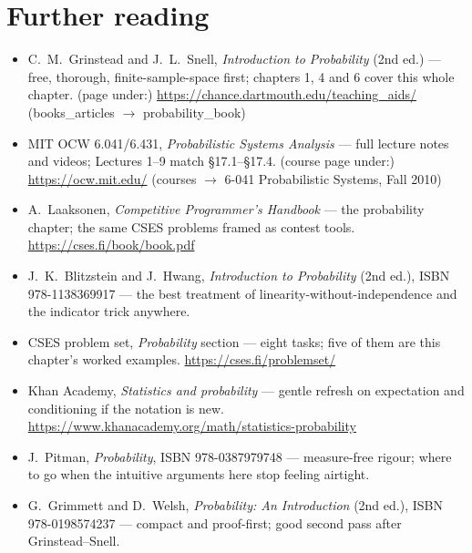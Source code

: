 \section*{Further reading}
\begin{itemize}
\item C.~M.~Grinstead and J.~L.~Snell, \emph{Introduction to
Probability} (2nd ed.) --- free, thorough, finite-sample-space
first; chapters 1, 4 and 6 cover this whole chapter.
(page under:) \newline\url{https://chance.dartmouth.edu/teaching_aids/}
(books\_articles $\to$ probability\_book)
\item MIT OCW 6.041/6.431, \emph{Probabilistic Systems Analysis}
--- full lecture notes and videos; Lectures 1--9 match
\S17.1--\S17.4. (course page under:)
\newline\url{https://ocw.mit.edu/} (courses $\to$ 6-041
Probabilistic Systems, Fall 2010)
\item A.~Laaksonen, \emph{Competitive Programmer's Handbook}
--- the probability chapter; the same CSES problems framed as
contest tools.
\newline\url{https://cses.fi/book/book.pdf}
\item J.~K.~Blitzstein and J.~Hwang, \emph{Introduction to
Probability} (2nd ed.), ISBN 978-1138369917 --- the best
treatment of linearity-without-independence and the indicator
trick anywhere.
\item CSES problem set, \emph{Probability} section ---
eight tasks; five of them are this chapter's worked examples.
\newline\url{https://cses.fi/problemset/}
\item Khan Academy, \emph{Statistics and probability} ---
gentle refresh on expectation and conditioning if the notation
is new.
\newline\url{https://www.khanacademy.org/math/statistics-probability}
\item J.~Pitman, \emph{Probability}, ISBN 978-0387979748 ---
measure-free rigour; where to go when the intuitive arguments
here stop feeling airtight.
\item G.~Grimmett and D.~Welsh, \emph{Probability: An
Introduction} (2nd ed.), ISBN 978-0198574237 --- compact and
proof-first; good second pass after Grinstead--Snell.
\end{itemize}

